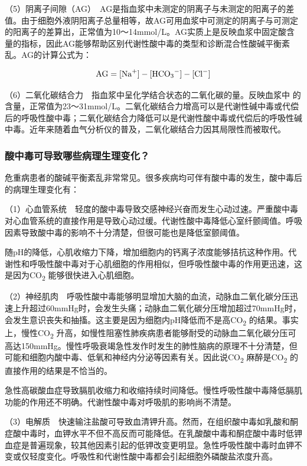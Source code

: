 （5）阴离子间隙（AG）　AG是指血浆中未测定的阴离子与未测定的阳离子的差值。由于细胞外液阴阳离子总量相等，故AG可用血浆中可测定的阴离子与可测定的阳离子的差算出，正常值为10～14mmol/L。AG实质上是反映血浆中固定酸含量的指标，因此AG能够帮助区别代谢性酸中毒的类型和诊断混合性酸碱平衡紊乱。AG的计算公式为：

\[
\text{AG}=[\ce{Na+}]-[\ce{HCO3-}]-[\ce{Cl-}]    
\]

（6）二氧化碳结合力　指血浆中呈化学结合状态的二氧化碳的量。反映血浆中
的含量，正常值为23～31mmol/L。二氧化碳结合力增高可以是代谢性碱中毒或代偿后的呼吸性酸中毒；二氧化碳结合力降低可以是代谢性酸中毒或代偿后的呼吸性碱中毒。近年来随着血气分析仪的普及，二氧化碳结合力因其局限性而被取代。

\subsubsection{酸中毒可导致哪些病理生理变化？}

危重病患者的酸碱平衡紊乱非常常见。很多疾病均可伴有酸中毒的发生，酸中毒后的病理生理变化有：

（1）心血管系统　轻度的酸中毒导致交感神经兴奋而发生心动过速。严重酸中毒对心血管系统的直接作用是导致心动过缓。代谢性酸中毒降低心室纤颤阈值。呼吸因素导致酸中毒的影响不十分清楚，但很可能也是降低室颤阈值。

随pH的降低，心肌收缩力下降，增加细胞内的钙离子浓度能够拮抗这种作用。代谢性和呼吸性酸中毒对于心肌细胞的作用相似，但呼吸性酸中毒的作用更迅速，这是因为CO\textsubscript{2}
能够很快进入心肌细胞。

（2）神经肌肉　呼吸性酸中毒能够明显增加大脑的血流，动脉血二氧化碳分压迅速上升超过60mmHg时，会发生头痛；动脉血二氧化碳分压增加超过70mmHg时，会发生意识丧失和抽搐。这主要是因为细胞内pH降低而不是高CO\textsubscript{2}
的结果。事实上，慢性CO\textsubscript{2}
升高，如慢性阻塞性肺疾病患者能够耐受的动脉血二氧化碳分压可高达150mmHg。慢性呼吸衰竭急性发作时发生的肺性脑病的原理不十分清楚，但可能和细胞内酸中毒、低氧和神经内分泌等因素有关。因此说CO\textsubscript{2}
麻醉是CO\textsubscript{2} 的直接作用的结果是不恰当的。

急性高碳酸血症导致膈肌收缩力和收缩持续时间降低。慢性呼吸性酸中毒降低膈肌功能的作用还不明确。代谢性酸中毒对呼吸肌的影响尚不清楚。

（3）电解质　快速输注盐酸可导致血清钾升高。然而，在组织酸中毒如乳酸和酮症酸中毒时，血钾水平不但不高反而可能降低。在乳酸酸中毒和酮症酸中毒时低钾血症是普遍现象，较其他因素引起的低钾改变更明显。急性呼吸性酸中毒时血钾不变或仅轻度变化。呼吸性和代谢性酸中毒都会引起细胞外磷酸盐浓度升高。

